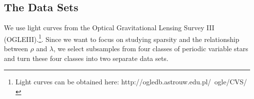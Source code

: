 \documentclass[10pt]{article}
\theoremstyle{definition}
\begin{document}









\subsection{The Data Sets}
We use light curves from the Optical Gravitational Lensing Survey III (OGLEIII).\footnote{Light curves can be obtained here: http://ogledb.astrouw.edu.pl/~ogle/CVS/}. Since we want to focus on studying sparsity and the relationship between $\rho$ and $\lambda$, we select subsamples from four classes of periodic variable stars and turn these four classes into two separate data sets.
\end{document}
